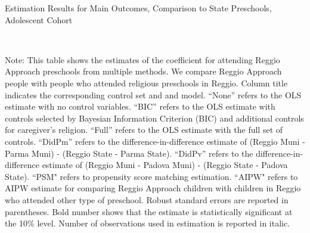 \begin{table}[H] \caption{Estimation Results for Main Outcomes, Comparison to State Preschools, Adolescent Cohort} \label{ols-M-adol-reg-stat}
\scalebox{0.8}{}
\vspace{1ex} \\
\footnotesize\raggedright{Note: This table shows the estimates of the coefficient for attending Reggio Approach preschools from multiple methods. We compare Reggio Approach people with people who attended religious preschools in Reggio. Column title indicates the corresponding control set and and model. ``None'' refers to the OLS estimate with no control variables. ``BIC'' refers to the OLS estimate with controls selected by Bayesian Information Criterion (BIC) and additional controls for caregiver's religion. ``Full'' refers to the OLS estimate with the full set of controls. ``DidPm'' refers to the difference-in-difference estimate of (Reggio Muni - Parma Muni) - (Reggio State - Parma State). ``DidPv'' refers to the difference-in-difference estimate of (Reggio Muni - Padova Muni) - (Reggio State - Padova State). ``PSM" refers to propensity score matching estimation. ``AIPW" refers to AIPW estimate for comparing Reggio Approach children with children in Reggio who attended other type of preschool. Robust standard errors are reported in parentheses. Bold number shows that the estimate is statistically significant at the 10\% level. Number of observations used in estimation is reported in italic.}
\end{table}





